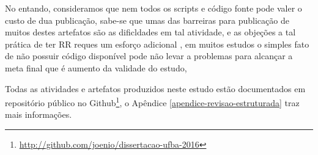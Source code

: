 No entando, consideramos que nem todos os scripts e código fonte pode
valer o custo de dua publicação, sabe-se que umas das barreiras para publicação
de muitos destes artefatos são as dificldades em tal atividade,
e as objeções a tal prática de ter RR reques um esforço adicional \cite{madeyski2017would},
em muitos
estudos o simples fato de não possuir código disponível pode não levar
a problemas para alcançar a meta final que é aumento da validade do estudo,


Todas as atividades e artefatos produzidos neste estudo estão documentados em
repositório público no
Github\footnote{\url{http://github.com/joenio/dissertacao-ufba-2016}}, o
Apêndice \ref{apendice-revisao-estruturada} traz mais informações.


